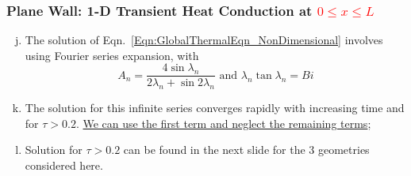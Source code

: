 \documentclass[10pt,compress,unknownkeysallowed]{beamer}
\newcommand{\frc}{\displaystyle\frac}
\newcommand{\red}{\textcolor{red}}
\begin{document}
\begin{frame}
 \frametitle{Plane Wall: 1-D Transient Heat Conduction at \red{$0\leq x\leq L$} }
   \begin{enumerate}[(a)]\setcounter{enumi}{9}%
     \item<1-> The solution of Eqn.~\ref{Eqn:GlobalThermalEqn_NonDimensional} involves using Fourier series expansion,
          with
          \begin{displaymath}
            A_{n} = \frc{4\sin{\lambda_{n}}}{2\lambda_{n}+\sin{2\lambda_{n}}}\text{ and } \lambda_{n}\tan{\lambda_{n}} = Bi
          \end{displaymath}
     \item<2-> The solution for this infinite series converges rapidly with increasing time and for $\tau > 0.2$. \underline{We can use the first term and neglect the remaining terms}; 
     \item<3-> Solution for $\tau>0.2$ can be found in the next slide for the 3 geometries considered here.

   \end{enumerate} 
\end{frame}
\end{document}

